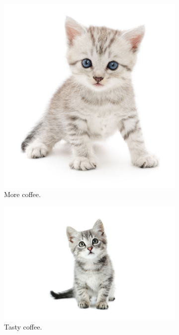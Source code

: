 \documentclass[12pt]{article}
\begin{document}
\begin{figure}[t!]
\begin{subfigure}[b]{0.3\linewidth}
    \includegraphics[width=\linewidth]{./kitten3.jpg}
    \caption{More coffee.}
  \end{subfigure}
  \begin{subfigure}[b]{0.3\linewidth}
    \includegraphics[width=\linewidth]{./kitten4.jpg}
    \caption{Tasty coffee.}
  \end{subfigure}
  \begin{subfigure}[b]{0.5\linewidth}

\end{subfigure}
\end{figure}
\end{document}
